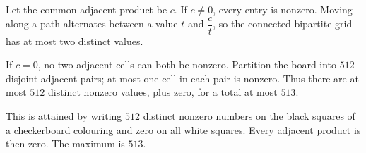 Let the common adjacent product be $c$. If $c\ne0$, every entry is nonzero. Moving along a path alternates between a value $t$ and $\dfrac{c}{t}$, so the connected bipartite grid has at most two distinct values.

If $c=0$, no two adjacent cells can both be nonzero. Partition the board into $512$ disjoint adjacent pairs; at most one cell in each pair is nonzero. Thus there are at most $512$ distinct nonzero values, plus zero, for a total at most $513$.

This is attained by writing $512$ distinct nonzero numbers on the black squares of a checkerboard colouring and zero on all white squares. Every adjacent product is then zero. The maximum is $\boxed{513}$.
